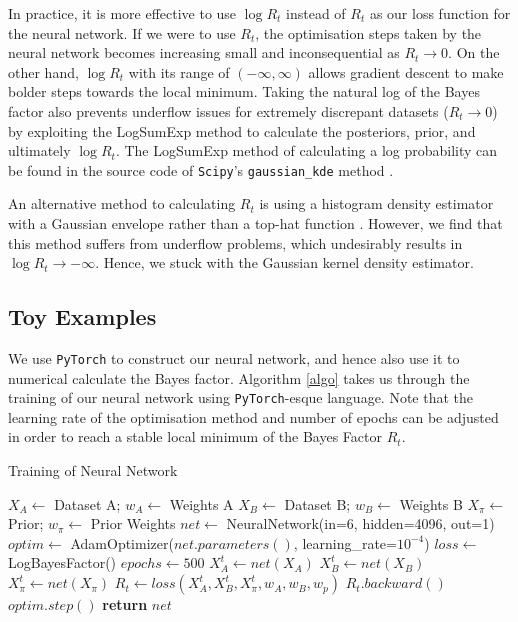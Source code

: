 \documentclass[%
 reprint,
 amsmath,amssymb,
 aps,
]{revtex4-2}
\begin{document}
In practice, it is more effective to use $\log R_t$ instead of $R_t$ as our loss function for the neural network. If we were to use $R_t$, the optimisation steps taken by the neural network becomes increasing small and inconsequential as $R_t \to 0$. On the other hand, $\log R_t$ with its range of $(-\infty, \infty)$ allows gradient descent to make bolder steps towards the local minimum. Taking the natural log of the Bayes factor also prevents underflow issues for extremely discrepant datasets ($R_t \to 0$) by exploiting the LogSumExp method to calculate the posteriors, prior, and ultimately $\log R_t$. The LogSumExp method of calculating a log probability can be found in the source code of \texttt{Scipy}'s \texttt{gaussian\_kde} method \cite{Scipy2020}.

An alternative method to calculating $R_t$ is using a histogram density estimator with a Gaussian envelope rather than a top-hat function \cite{Schutt2017}. However, we find that this method suffers from underflow problems, which undesirably results in $\log R_t \to - \infty$. Hence, we stuck with the Gaussian kernel density estimator.


\subsection{Toy Examples}

We use \texttt{PyTorch} to construct our neural network, and hence also use it to numerical calculate the Bayes factor. Algorithm \ref{algo} takes us through the training of our neural network using \texttt{PyTorch}-esque language. Note that the learning rate of the optimisation method and number of epochs can be adjusted in order to reach a stable local minimum of the Bayes Factor $R_t$.
\begin{algorithm}[H]
\caption{Training of Neural Network}\label{algo}
    \begin{algorithmic}[1]
    \State $X_A \gets $ Dataset A; $w_A \gets $ Weights A 
    \State $X_B \gets $ Dataset B; $w_B \gets $ Weights B
    \State $X_\pi \gets $ Prior; $w_\pi \gets $ Prior Weights
    \State
    \State $net \gets $ NeuralNetwork(in=6, hidden=4096, out=1)
    \State $optim \gets $ AdamOptimizer($net.parameters()$, learning\_rate=$10^{-4}$)
    \State $loss \gets $ LogBayesFactor()
    \State $epochs \gets 500$
    \State
        \State $X_A^t \gets net(X_A)$ 
        \State $X_B^t \gets net(X_B)$
        \State $X_\pi^t \gets net(X_\pi)$
        \State
        \State $R_t \gets loss(X_A^t, X_B^t, X_\pi^t, w_A, w_B, w_p)$
        \State $R_t.backward()$ 
        \State $optim.step()$ 
    \EndFor
    \State
    \State \textbf{return} $net$
    \end{algorithmic}
\end{algorithm}
\end{document}
